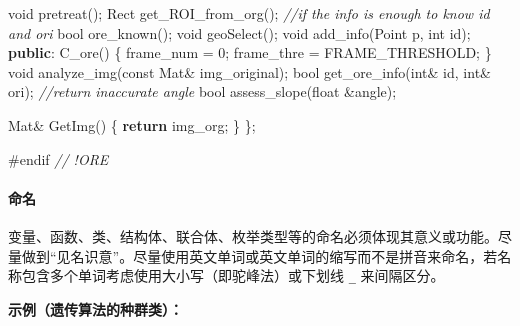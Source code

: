 \documentclass[
]{article}
\newenvironment{Shaded}{}{}
\newcommand{\AttributeTok}[1]{\textcolor[rgb]{0.49,0.56,0.16}{#1}}
\newcommand{\CommentTok}[1]{\textcolor[rgb]{0.38,0.63,0.69}{\textit{#1}}}
\newcommand{\ControlFlowTok}[1]{\textcolor[rgb]{0.00,0.44,0.13}{\textbf{#1}}}
\newcommand{\DataTypeTok}[1]{\textcolor[rgb]{0.56,0.13,0.00}{#1}}
\newcommand{\DecValTok}[1]{\textcolor[rgb]{0.25,0.63,0.44}{#1}}
\newcommand{\KeywordTok}[1]{\textcolor[rgb]{0.00,0.44,0.13}{\textbf{#1}}}
\newcommand{\NormalTok}[1]{#1}
\newcommand{\OperatorTok}[1]{\textcolor[rgb]{0.40,0.40,0.40}{#1}}
\newcommand{\PreprocessorTok}[1]{\textcolor[rgb]{0.74,0.48,0.00}{#1}}
\begin{document}
\begin{Shaded}
\begin{Highlighting}[]
	\DataTypeTok{void}\NormalTok{ pretreat}\OperatorTok{();}
\NormalTok{	Rect get\_ROI\_from\_org}\OperatorTok{();}
	\CommentTok{//if the info is enough to know id and ori}
	\DataTypeTok{bool}\NormalTok{ ore\_known}\OperatorTok{();}
	\DataTypeTok{void}\NormalTok{ geoSelect}\OperatorTok{();}
	\DataTypeTok{void}\NormalTok{ add\_info}\OperatorTok{(}\NormalTok{Point p}\OperatorTok{,} \DataTypeTok{int}\NormalTok{ id}\OperatorTok{);}
\KeywordTok{public}\OperatorTok{:}
\NormalTok{	C\_ore}\OperatorTok{()} \OperatorTok{\{}
\NormalTok{		frame\_num  }\OperatorTok{=} \DecValTok{0}\OperatorTok{;}
\NormalTok{		frame\_thre }\OperatorTok{=}\NormalTok{ FRAME\_THRESHOLD}\OperatorTok{;}
	\OperatorTok{\}}
	\DataTypeTok{void}\NormalTok{ analyze\_img}\OperatorTok{(}\AttributeTok{const}\NormalTok{ Mat}\OperatorTok{\&}\NormalTok{ img\_original}\OperatorTok{);}
	\DataTypeTok{bool}\NormalTok{ get\_ore\_info}\OperatorTok{(}\DataTypeTok{int}\OperatorTok{\&}\NormalTok{ id}\OperatorTok{,} \DataTypeTok{int}\OperatorTok{\&}\NormalTok{ ori}\OperatorTok{);}
	\CommentTok{//return inaccurate angle}
	\DataTypeTok{bool}\NormalTok{ assess\_slope}\OperatorTok{(}\DataTypeTok{float} \OperatorTok{\&}\NormalTok{angle}\OperatorTok{);}

\NormalTok{	Mat}\OperatorTok{\&}\NormalTok{ GetImg}\OperatorTok{()} \OperatorTok{\{} \ControlFlowTok{return}\NormalTok{ img\_org}\OperatorTok{;} \OperatorTok{\}}
\OperatorTok{\};}

\PreprocessorTok{\#endif }\CommentTok{// !ORE}
\end{Highlighting}
\end{Shaded}

\hypertarget{ux547dux540d}{%
\paragraph{命名}\label{ux547dux540d}}

变量、函数、类、结构体、联合体、枚举类型等的命名必须体现其意义或功能。尽量做到``见名识意''。尽量使用英文单词或英文单词的缩写而不是拼音来命名，若名称包含多个单词考虑使用大小写（即驼峰法）或下划线
\texttt{\_} 来间隔区分。

\textbf{示例（遗传算法的种群类）：}
\end{document}

